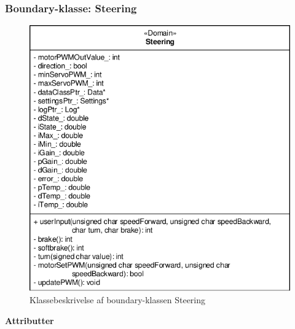 
\subsubsection{Boundary-klasse: Steering}

\begin{figure}[h]
\centering
\includegraphics[]{../fig/diagrammer/bil/cd_steering.pdf}
\caption{Klassebeskrivelse af boundary-klassen Steering}
\label{fig:cd_Steering}
\end{figure}

\textbf{Attributter}

